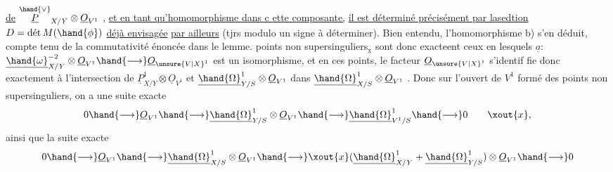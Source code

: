 
\uline{de} $\overset{\hand{\vee}}{\underline{P}}_{X/Y}\otimes\underline{O}_{V^1}$ , \uline{et en tant qu'homomorphisme dans c ette composante,}
\uline{il est déterminé précisément par lasedtion} $D = \text{dét}\,M(\hand{\phi})$ \uline{déjà envisagée}
\uline{par ailleurs} (tjrs modulo un signe à déterminer). Bien entendu,
l'homomorphisme b) s'en déduit, compte tenu de la commutativité énoncée
dans le lemme.  points non supersinguliers$_{\text{x}}$ sont donc exacteent
ceux en lesquels $\underline{a}$: $\underline{\hand{\omega}}^{-2}_{X/Y}\otimes\underline{O}_{V^1}\hand{\longrightarrow}\underline{O}_{\unsure{V|X}^1}$ est un isomorphisme, et en
ces points,  le facteur $\underline{O}_{\unsure{V|X}^1}$ s'identif
fie donc exactement à l'intersection de $\underline{P}^1_{X/Y}\otimes\underline{O}_{V^1}$ et $\underline{\hand{\Omega}}^1_{Y/S}\otimes\underline{O}_{V^1}$
dans $\underline{\hand{\Omega}}^1_{X/S}\otimes\underline{O}_{V^1}$ . Donc sur l'ouvert de $V^1$ formé des points non
supersinguliers, on a une suite exacte
\[ 0\hand{\longrightarrow}\underline{O}_{V^1}\hand{\longrightarrow}\underline{\hand{\Omega}}^1_{Y/S}\otimes\underline{O}_{V^1}\hand{\longrightarrow}\underline{\hand{\Omega}}^1_{V^1/S}\hand{\longrightarrow} 0 \qquad \xout{x}, \]
ainsi que la suite exacte
\[ 0\hand{\longrightarrow}\underline{O}_{V^1}\hand{\longrightarrow}\underline{\hand{\Omega}}^1_{X/S}\otimes\underline{O}_{V^1}\hand{\longrightarrow}\xout{x}(\underline{\hand{\Omega}}^1_{X/Y}+\underline{\hand{\Omega}}^1_{Y/S})\otimes\underline{O}_{V^1}\hand{\longrightarrow} 0 \]

